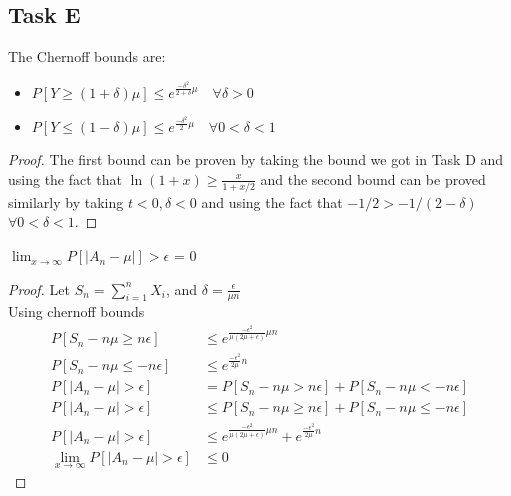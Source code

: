 \subsection*{Task E}
\begin{claim}
	The Chernoff bounds are:\\
	\begin{itemize}
		\item \(P[Y\geq (1+\delta)\mu] \leq e^{\frac{-\delta^2}{2+\delta}\mu} \hspace{1em}\forall \delta >0 \)
		\item \(P[Y\leq (1-\delta)\mu] \leq e^{\frac{-\delta^2}{2}\mu} \hspace{1em}\forall 0< \delta < 1\)
	\end{itemize}
\end{claim}
\begin{proof}
	The first bound can be proven by taking the bound we got in Task D and using the fact that \(\ln(1+x) \geq \frac{x}{1+x/2}\) and the second bound can be proved similarly by taking \(t < 0, \delta <0\) and using the fact that \(-1/2 > -1/(2-\delta)\) \(\forall 0<\delta<1\).
\end{proof}
\begin{claim}
	\(\lim_{x\to\infty} P[|A_n - \mu|] > \epsilon \) = 0
\end{claim}
\begin{proof}
	Let \(S_n = \sum_{i=1}^n X_i \), and \(\delta = \frac{\epsilon}{\mu n }\)\\
	Using chernoff bounds
	\begin{align*}
		P[S_n - n \mu \geq n \epsilon]            & \leq e^{\frac{-\epsilon ^2}{\mu (2\mu +\epsilon)}\mu n}                                  \\
		P[S_n - n\mu \leq - n\epsilon]            & \leq e^{\frac{-\epsilon ^2}{2\mu}n}                                                      \\
		P[|A_n-\mu| > \epsilon]                   & = P[S_n - n \mu > n \epsilon] + P[S_n - n\mu < - n\epsilon]                              \\
		P[|A_n-\mu| > \epsilon]                   & \leq P[S_n - n\mu \geq n\epsilon] + P[S_n - n\mu \leq - n\epsilon]                       \\
		P[|A_n-\mu| > \epsilon]                   & \leq e^{\frac{-\epsilon ^2}{\mu (2\mu +\epsilon)}\mu n} + e^{\frac{-\epsilon ^2}{2\mu}n} \\
		\lim_{x\to\infty} P[|A_n-\mu| > \epsilon] & \leq 0
	\end{align*}
\end{proof}

